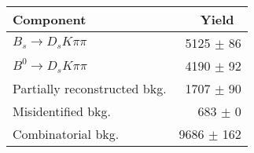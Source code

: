  \begin{tabular}{l r }
\hline\hline
Component & Yield\ \\
\hline
$B_s \to D_s K \pi \pi$ & 5125 $\pm$ 86 \\
$B^{0} \to D_s K \pi \pi$ & 4190 $\pm$ 92 \\
Partially reconstructed bkg. & 1707 $\pm$ 90 \\
Misidentified bkg. & 683 $\pm$ 0 \\
Combinatorial bkg. & 9686 $\pm$ 162 \\
\hline\hline
\end{tabular}
\label{table:signalYields}

